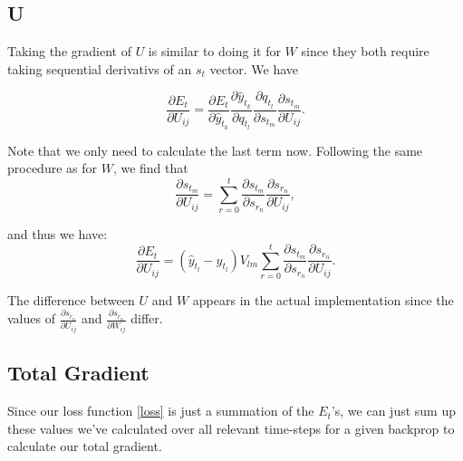 \documentclass[11pt,twoside]{article}
\begin{document}
\subsection{U}
Taking the gradient of $U$ is similar to doing it for $W$ since they both require taking sequential derivativs of an $s_t$ vector. We have

\begin{equation}
\frac{\partial E_t}{\partial U_{ij}}=\frac{\partial E_t}{\partial \hat{y}_{t_k}}\frac{\partial \hat{y}_{t_k}}{\partial q_{t_l}}\frac{\partial q_{t_l}}{\partial s_{t_m}}\frac{\partial s_{t_m}}{\partial U_{ij}}.
\end{equation}

\noindent Note that we only need to calculate the last term now. Following the same procedure as for $W$, we find that
\begin{equation}
\frac{\partial s_{t_m}}{\partial U_{ij}}=\sum_{r=0}^{t}\frac{\partial s_{t_m}}{\partial s_{r_n}}\frac{\partial s_{r_n}}{\partial U_{ij}},
\end{equation}

\noindent and thus we have:
\begin{equation}
\frac{\partial E_t}{\partial U_{ij}}=\left(\hat{y}_{t_l}-y_{t_l}\right)V_{lm}\sum_{r=0}^{t}\frac{\partial s_{t_m}}{\partial s_{r_n}}\frac{\partial s_{r_n}}{\partial U_{ij}}.
\end{equation}

The difference between $U$ and $W$ appears in the actual implementation since the values of $\frac{\partial s_{r_n}}{\partial U_{ij}}$ and $\frac{\partial s_{r_n}}{\partial W_{ij}}$ differ.

\subsection{Total Gradient}
Since our loss function \eqref{loss} is just a summation of the $E_t$'s, we can just sum up these values we've calculated over all relevant time-steps for a given backprop to calculate our total gradient.
\end{document}
